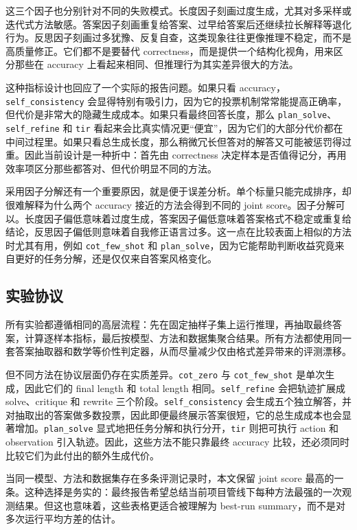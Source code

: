 \documentclass[conference]{IEEEtran}
\begin{document}
这三个因子也分别针对不同的失败模式。长度因子刻画过度生成，尤其对多采样或迭代式方法敏感。答案因子刻画重复给答案、过早给答案后还继续拉长解释等退化行为。反思因子刻画过多犹豫、反复自查，这类现象往往更像推理不稳定，而不是高质量修正。它们都不是要替代 correctness，而是提供一个结构化视角，用来区分那些在 accuracy 上看起来相同、但推理行为其实差异很大的方法。

这种指标设计也回应了一个实际的报告问题。如果只看 accuracy，\texttt{self\_consistency} 会显得特别有吸引力，因为它的投票机制常常能提高正确率，但代价是非常大的隐藏生成成本。如果只看最终回答长度，那么 \texttt{plan\_solve}、\texttt{self\_refine} 和 \texttt{tir} 看起来会比真实情况更“便宜”，因为它们的大部分代价都在中间过程里。如果只看总生成长度，那么稍微冗长但答对的解答又可能被惩罚得过重。因此当前设计是一种折中：首先由 correctness 决定样本是否值得记分，再用效率项区分那些都答对、但代价明显不同的方法。

采用因子分解还有一个重要原因，就是便于误差分析。单个标量只能完成排序，却很难解释为什么两个 accuracy 接近的方法会得到不同的 joint score。因子分解可以。长度因子偏低意味着过度生成，答案因子偏低意味着答案格式不稳定或重复给结论，反思因子偏低则意味着自我修正语言过多。这一点在比较表面上相似的方法时尤其有用，例如 \texttt{cot\_few\_shot} 和 \texttt{plan\_solve}，因为它能帮助判断收益究竟来自更好的任务分解，还是仅仅来自答案风格变化。

\subsection{实验协议}
所有实验都遵循相同的高层流程：先在固定抽样子集上运行推理，再抽取最终答案，计算逐样本指标，最后按模型、方法和数据集聚合结果。所有方法都使用同一套答案抽取器和数学等价性判定器，从而尽量减少仅由格式差异带来的评测漂移。

但不同方法在协议层面仍存在实质差异。\texttt{cot\_zero} 与 \texttt{cot\_few\_shot} 是单次生成，因此它们的 final length 和 total length 相同。\texttt{self\_refine} 会把轨迹扩展成 solve、critique 和 rewrite 三个阶段。\texttt{self\_consistency} 会生成五个独立解答，并对抽取出的答案做多数投票，因此即便最终展示答案很短，它的总生成成本也会显著增加。\texttt{plan\_solve} 显式地把任务分解和执行分开，\texttt{tir} 则把可执行 action 和 observation 引入轨迹。因此，这些方法不能只靠最终 accuracy 比较，还必须同时比较它们为此付出的额外生成代价。

当同一模型、方法和数据集存在多条评测记录时，本文保留 joint score 最高的一条。这种选择是务实的：最终报告希望总结当前项目管线下每种方法最强的一次观测结果。但这也意味着，这些表格更适合被理解为 best-run summary，而不是对多次运行平均方差的估计。
\end{document}
